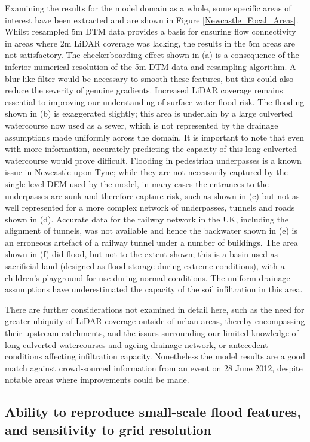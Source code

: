 Examining the results for the model domain as a whole, some specific areas of interest have been extracted and are shown in Figure \ref{Newcastle_Focal_Areas}. Whilst resampled 5m DTM data provides a basis for ensuring flow connectivity in areas where 2m LiDAR coverage was lacking, the results in the 5m areas are not satisfactory. The checkerboarding effect shown in (a) is a consequence of the inferior numerical resolution of the 5m DTM data and resampling algorithm. A blur-like filter would be necessary to smooth these features, but this could also reduce the severity of genuine gradients. Increased LiDAR coverage remains essential to improving our understanding of surface water flood risk. The flooding shown in (b) is exaggerated slightly; this area is underlain by a large culverted watercourse now used as a sewer, which is not represented by the drainage assumptions made uniformly across the domain. It is important to note that even with more information, accurately predicting the capacity of this long-culverted watercourse would prove difficult. Flooding in pedestrian underpasses is a known issue in Newcastle upon Tyne; while they are not necessarily captured by the single-level DEM used by the model, in many cases the entrances to the underpasses are sunk and therefore capture risk, such as shown in (c) but not as well represented for a more complex network of underpasses, tunnels and roads shown in (d). Accurate data for the railway network in the UK, including the alignment of tunnels, was not available and hence the backwater shown in (e) is an erroneous artefact of a railway tunnel under a number of buildings. The area shown in (f) did flood, but not to the extent shown; this is a basin used as sacrificial land (designed as flood storage during extreme conditions), with a children's playground for use during normal conditions. The uniform drainage assumptions have underestimated the capacity of the soil infiltration in this area.

There are further considerations not examined in detail here, such as the need for greater ubiquity of LiDAR coverage outside of urban areas, thereby encompassing their upstream catchments, and the issues surrounding our limited knowledge of long-culverted watercourses and ageing drainage network, or antecedent conditions affecting infiltration capacity. Nonetheless the model results are a good match against crowd-sourced information from an event on 28 June 2012, despite notable areas where improvements could be made.

\subsection{Ability to reproduce small-scale flood features, and sensitivity to grid resolution}

